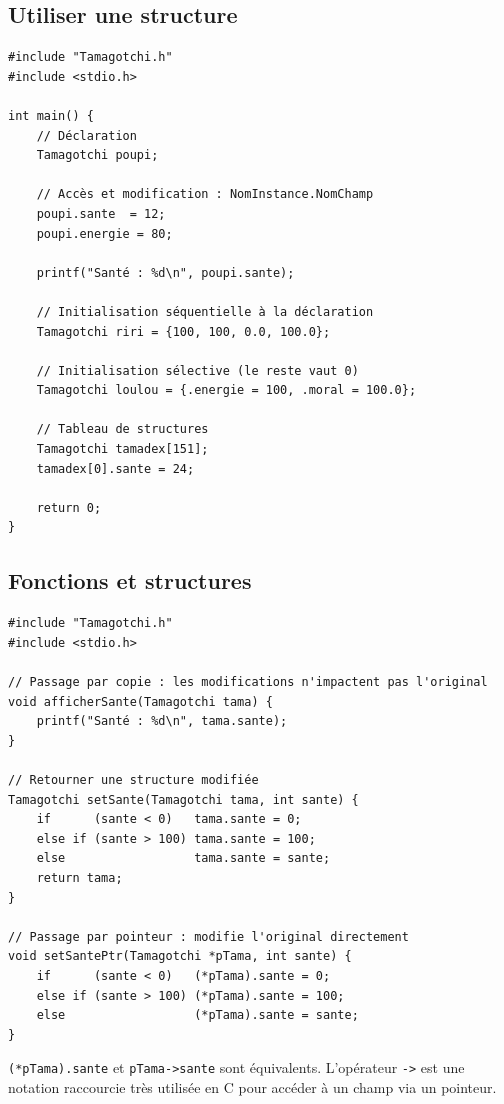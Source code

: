 \documentclass[12pt,a4paper]{article}
\begin{document}
\subsection{Utiliser une structure}

\begin{lstlisting}[caption={Déclaration, initialisation et accès}]
#include "Tamagotchi.h"
#include <stdio.h>

int main() {
    // Déclaration
    Tamagotchi poupi;

    // Accès et modification : NomInstance.NomChamp
    poupi.sante  = 12;
    poupi.energie = 80;

    printf("Santé : %d\n", poupi.sante);

    // Initialisation séquentielle à la déclaration
    Tamagotchi riri = {100, 100, 0.0, 100.0};

    // Initialisation sélective (le reste vaut 0)
    Tamagotchi loulou = {.energie = 100, .moral = 100.0};

    // Tableau de structures
    Tamagotchi tamadex[151];
    tamadex[0].sante = 24;

    return 0;
}
\end{lstlisting}

\subsection{Fonctions et structures}

\begin{lstlisting}[caption={Tamagotchi.c — associer des fonctions à une structure}]
#include "Tamagotchi.h"
#include <stdio.h>

// Passage par copie : les modifications n'impactent pas l'original
void afficherSante(Tamagotchi tama) {
    printf("Santé : %d\n", tama.sante);
}

// Retourner une structure modifiée
Tamagotchi setSante(Tamagotchi tama, int sante) {
    if      (sante < 0)   tama.sante = 0;
    else if (sante > 100) tama.sante = 100;
    else                  tama.sante = sante;
    return tama;
}

// Passage par pointeur : modifie l'original directement
void setSantePtr(Tamagotchi *pTama, int sante) {
    if      (sante < 0)   (*pTama).sante = 0;
    else if (sante > 100) (*pTama).sante = 100;
    else                  (*pTama).sante = sante;
}
\end{lstlisting}

\begin{astuce}
\texttt{(*pTama).sante} et \texttt{pTama->sante} sont équivalents. L'opérateur \texttt{->} est une notation raccourcie très utilisée en C pour accéder à un champ via un pointeur.
\end{astuce}
\end{document}
